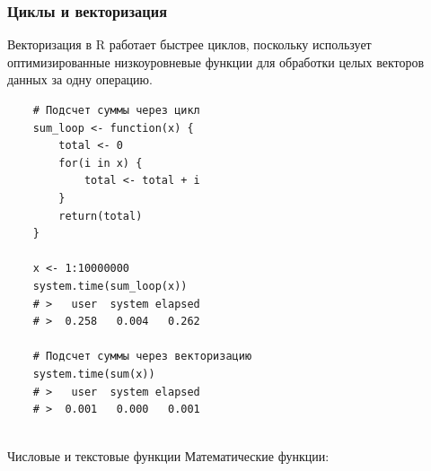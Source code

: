 \documentclass[11pt,a4paper]{beamer}
\begin{document}
	\begin{frame}[fragile]
	\frametitle{Циклы и векторизация}
	Векторизация в R работает быстрее циклов, поскольку использует оптимизированные низкоуровневые функции для обработки целых векторов данных за одну операцию.
	{\fontsize{8}{9}\selectfont
		\begin{verbatim}
    # Подсчет суммы через цикл
    sum_loop <- function(x) {
        total <- 0
        for(i in x) {
            total <- total + i
        }
        return(total)
    }
			
    x <- 1:10000000
    system.time(sum_loop(x))
    # >   user  system elapsed 
    # >  0.258   0.004   0.262
			
    # Подсчет суммы через векторизацию
    system.time(sum(x))
    # >   user  system elapsed 
    # >  0.001   0.000   0.001
			
		\end{verbatim}
	}
\end{frame}
	
	
	
	\begin{frame}{Числовые и текстовые функции}
		Математические функции:
	\end{frame}
	
\end{document}

